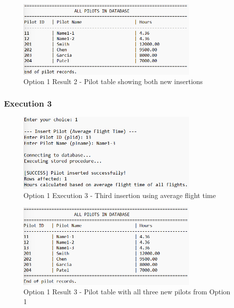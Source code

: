 \documentclass[12pt]{article}
\begin{document}
\begin{figure}[h]
\centering
\includegraphics[width=0.8\textwidth]{../../../Screenshots/Problem1/Option1/Option1-2_result.png}
\caption{Option 1 Result 2 - Pilot table showing both new insertions}
\label{fig:option1_result2}
\end{figure}

\newpage
\subsubsection{Execution 3}

\begin{figure}[h]
\centering
\includegraphics[width=0.8\textwidth]{../../../Screenshots/Problem1/Option1/Option1-3.png}
\caption{Option 1 Execution 3 - Third insertion using average flight time}
\label{fig:option1_exec3}
\end{figure}

\begin{figure}[h]
\centering
\includegraphics[width=0.8\textwidth]{../../../Screenshots/Problem1/Option1/Option1-3_result.png}
\caption{Option 1 Result 3 - Pilot table with all three new pilots from Option 1}
\label{fig:option1_result3}
\end{figure}
\end{document}
